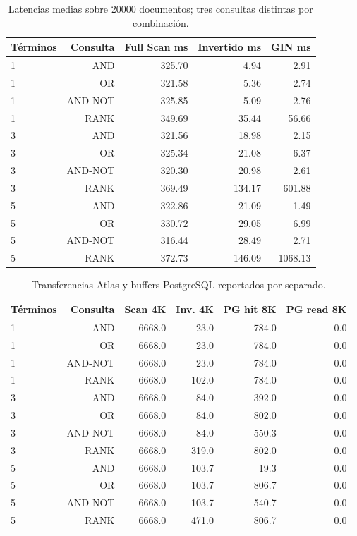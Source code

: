 \documentclass[11pt,a4paper]{article}
\renewcommand{\arraystretch}{1.2}
\begin{document}
\begin{table}[H]\centering\footnotesize\renewcommand{\arraystretch}{1.0}
\caption{Latencias medias sobre 20000 documentos; tres consultas distintas por combinación.}
\begin{tabular}{@{}lrrrr@{}}\toprule
Términos & Consulta & Full Scan ms & Invertido ms & GIN ms \\ \midrule
1 & AND & 325.70 & 4.94 & 2.91 \\
1 & OR & 321.58 & 5.36 & 2.74 \\
1 & AND-NOT & 325.85 & 5.09 & 2.76 \\
1 & RANK & 349.69 & 35.44 & 56.66 \\
3 & AND & 321.56 & 18.98 & 2.15 \\
3 & OR & 325.34 & 21.08 & 6.37 \\
3 & AND-NOT & 320.30 & 20.98 & 2.61 \\
3 & RANK & 369.49 & 134.17 & 601.88 \\
5 & AND & 322.86 & 21.09 & 1.49 \\
5 & OR & 330.72 & 29.05 & 6.99 \\
5 & AND-NOT & 316.44 & 28.49 & 2.71 \\
5 & RANK & 372.73 & 146.09 & 1068.13 \\
\bottomrule\end{tabular}\end{table}

\begin{table}[H]\centering\footnotesize\renewcommand{\arraystretch}{1.0}
\caption{Transferencias Atlas y buffers PostgreSQL reportados por separado.}
\begin{tabular}{@{}lrrrrr@{}}\toprule
Términos & Consulta & Scan 4K & Inv. 4K & PG hit 8K & PG read 8K \\ \midrule
1 & AND & 6668.0 & 23.0 & 784.0 & 0.0 \\
1 & OR & 6668.0 & 23.0 & 784.0 & 0.0 \\
1 & AND-NOT & 6668.0 & 23.0 & 784.0 & 0.0 \\
1 & RANK & 6668.0 & 102.0 & 784.0 & 0.0 \\
3 & AND & 6668.0 & 84.0 & 392.0 & 0.0 \\
3 & OR & 6668.0 & 84.0 & 802.0 & 0.0 \\
3 & AND-NOT & 6668.0 & 84.0 & 550.3 & 0.0 \\
3 & RANK & 6668.0 & 319.0 & 802.0 & 0.0 \\
5 & AND & 6668.0 & 103.7 & 19.3 & 0.0 \\
5 & OR & 6668.0 & 103.7 & 806.7 & 0.0 \\
5 & AND-NOT & 6668.0 & 103.7 & 540.7 & 0.0 \\
5 & RANK & 6668.0 & 471.0 & 806.7 & 0.0 \\
\bottomrule\end{tabular}\end{table}
\end{document}
